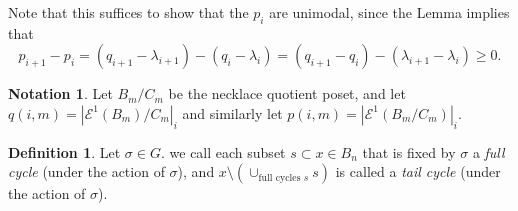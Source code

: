 \documentclass[10 pt]{amsart}
\theoremstyle{plain}
\theoremstyle{definition}
\newtheorem{defn}[thm]{Definition}
\newtheorem{note}[thm]{Notation}
\theoremstyle{remark}
\numberwithin{equation}{section}
\begin{document}
Note that this suffices to show that the $p_i$ are unimodal, since the Lemma implies that
$$p_{i+1} - p_{i} = (q_{i+1} - \lambda_{i+1}) - (q_i - \lambda_i) = (q_{i+1} - q_i) - (\lambda_{i+1}- \lambda_i) \ge 0.$$ 

\begin{note} Let $B_m/C_m$ be the necklace quotient poset, and let $q (i, m) = |\mathcal E^1 (B_m)/C_m|_{i}$ and similarly let $p (i, m) = |\mathcal E^1 (B_m/C_m)|_{i}$. 
\end{note}

\begin{defn}
Let  $\sigma \in G.$ we call each subset $s \subset x \in B_n$ that is fixed by $\sigma$ a \textit{full cycle} (under the action of $\sigma$), and $x \setminus \left(\cup_{\text{full cycles } s} s\right)$ is called a \textit{tail cycle} (under the action of $\sigma$).  
\end{defn}
\end{document}
